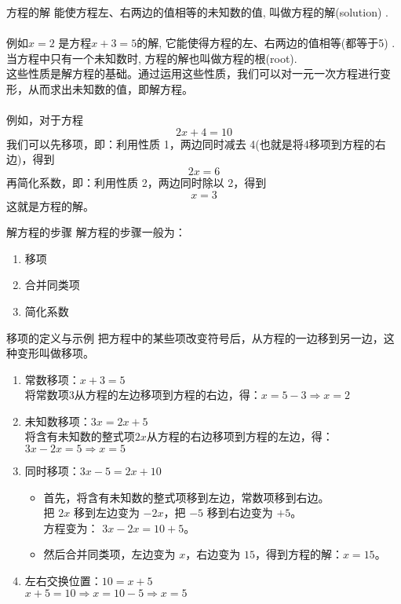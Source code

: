 \documentclass{ctexbeamer}
\begin{document}
\begin{frame}[t]{方程的解}
\alert{能使方程左、右两边的值相等的未知数的值}, 叫做\alert{方程的解(solution) }.\\
\\
例如$x = 2$ 是方程$x + 3 = 5$的解, 它能使得方程的左、右两边的值相等(都等于5) . \\
当方程中只有一个未知数时, 方程的解也叫做方程的根(root).\\
这些性质是解方程的基础。通过运用这些性质，我们可以对一元一次方程进行变形，从而求出未知数的值，即\alert{解方程}。\\
\\
例如，对于方程
\[2x + 4 = 10\]
我们可以先\alert{移项}，即：利用性质 1，两边同时减去 4(也就是将4移项到方程的右边)，得到
 \[2x = 6\]
再\alert{简化系数}，即：利用性质 2，两边同时除以 2，得到
 \[x = 3\] 
这就是方程的解。
\end{frame}

\begin{frame}[t]{解方程的步骤}
解方程的步骤一般为：
\begin{enumerate}[label={\arabic*.}]
\item 移项
\item 合并同类项
\item 简化系数
\end{enumerate}
\end{frame}

\begin{frame}[t]{移项的定义与示例}
把方程中的某些项改变符号后，从方程的一边移到另一边，这种变形叫做\alert{移项}。
\begin{enumerate}[label={\arabic*.}]
\item \alert{常数移项}：$x + 3 = 5$ \\
将常数项$3$从方程的左边移项到方程的右边，得：$x = 5 - 3 \Rightarrow x = 2$
\item \alert{未知数移项}：$3x = 2x + 5$ \\
将含有未知数的整式项$2x$从方程的右边移项到方程的左边，得：$3x - 2x = 5 \Rightarrow x = 5$
\item \alert{同时移项}：$3x - 5 = 2x + 10$ 
\begin{itemize}
\item 首先，将含有未知数的整式项移到左边，常数项移到右边。\\
把 \(2x\) 移到左边变为 \(-2x\)，把 \(-5\) 移到右边变为 \(+5\)。\\
方程变为： \(3x - 2x = 10 + 5\)。
\item 然后合并同类项，左边变为 \(x\)，右边变为 \(15\)，得到方程的解：\(x = 15\)。
\end{itemize}
\item \alert{左右交换位置}：$10 = x + 5$ \\
$x + 5 = 10 \Rightarrow x = 10 - 5 \Rightarrow x = 5$
\end{enumerate}

\end{frame}
\end{document}
